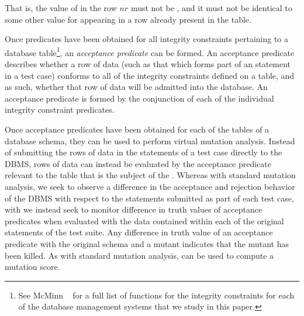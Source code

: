 \vspace{-.5em}
\begin{center}
\end{center}
\vspace{-.5em}

\noindent That is, the value of  in the row $nr$ must not
be \NULL, and it must not be identical to some other value for  appearing in a row already present in the table.

% 

Once predicates have been obtained for all integrity constraints pertaining to a database table\footnote{{\scriptsize See McMinn \etal~\cite{McMinn2015} for a full list of functions for the integrity constraints for each of the database management systems that we study in this paper.}}, an {\it acceptance predicate} can be formed. An acceptance predicate describes whether a row of data (such as that which forms part of an \INSERT statement in a test case) conforms to all of the integrity constraints defined on a table, and as such, whether that row of data will be admitted into the database. An acceptance predicate is formed by the conjunction of each of the individual integrity constraint predicates.


 Once acceptance predicates have been obtained for each of the tables of a database schema, they can be used to perform virtual mutation analysis. Instead of submitting the rows of data in the \INSERT statements of a test case directly to the DBMS, rows of data can instead be evaluated by the acceptance predicate relevant to the table that is the subject of the \INSERT. Whereas with standard mutation analysis, we seek to observe a difference in the acceptance and rejection behavior of the DBMS with respect to the \INSERT statements submitted as part of each test case, with \vma we instead seek to monitor difference in truth values of acceptance predicates when evaluated with the data contained within each of the original \INSERT statements of the test suite. Any difference in truth value of an acceptance predicate with the original schema and a mutant indicates that the mutant has been killed. As with standard mutation analysis, \vma can be used to compute a mutation score.


